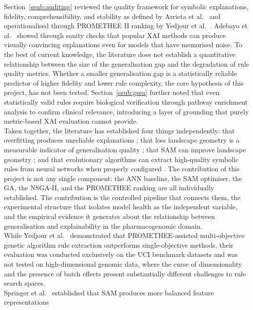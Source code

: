 Section~\ref{ssub:auditing} reviewed the quality framework for symbolic explanations, fidelity,
comprehensibility, and stability as defined by Arrieta et al.~\cite{Arrieta2020} and operationalised
through PROMETHEE II ranking by Yedjour et al.~\cite{Yedjour2024}. Adebayo et al.~\cite{Adebayo2018}
showed through sanity checks that popular XAI methods can produce visually convincing explanations
even for models that have memorised noise. To the best of current knowledge, the literature does not
establish a quantitative relationship between the size of the generalisation gap and the degradation
of rule quality metrics. Whether a smaller generalisation gap is a statistically reliable predictor of
higher fidelity and lower rule complexity, the core hypothesis of this project, has not been tested.
Section~\ref{ssub:gsea} further noted that even statistically valid rules require biological
verification through pathway enrichment analysis to confirm clinical relevance, introducing a layer of
grounding that purely metric-based XAI evaluation cannot provide.
\\
Taken together, the literature has established four things independently: that overfitting produces
unreliable explanations \cite{Pahde2023,Adebayo2018}; that loss landscape geometry is a measurable
indicator of generalisation quality \cite{Li2018}; that SAM can improve landscape geometry
\cite{Foret2021}; and that evolutionary algorithms can extract high-quality symbolic rules from neural
networks when properly configured \cite{Yedjour2024}. The contribution of this project is not any
single component: the ANN baseline, the SAM optimiser, the GA, the NSGA-II, and the PROMETHEE ranking
are all individually established. The contribution is the controlled pipeline that connects them, the
experimental structure that isolates model health as the independent variable, and the empirical
evidence it generates about the relationship between generalisation and explainability in the
pharmacogenomic domain.
\\
While Yedjour et al.~\cite{Yedjour2024} demonstrated that PROMETHEE-assisted multi-objective genetic
algorithm rule extraction outperforms single-objective methods, their evaluation was conducted
exclusively on the UCI benchmark datasets and was not tested on high-dimensional genomic data, where
the curse of dimensionality and the presence of batch effects present substantially different
challenges to rule search spaces.
\\
Springer et al.~\cite{Springer2024} established that SAM produces more balanced feature representations
